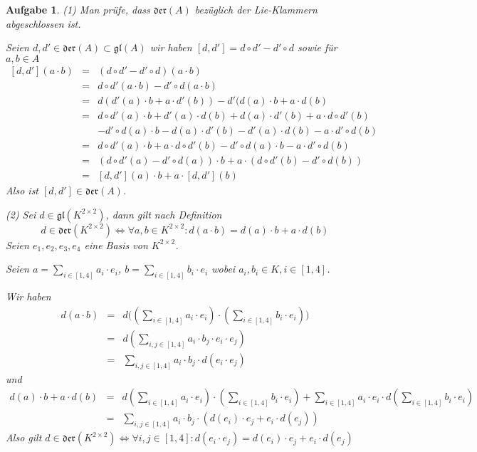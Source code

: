 \documentclass[12pt,leqno,twoside]{book}
\newcommand{\barcl}{\begin{array}{rcl}}
\newcommand{\ea}{\end{array}}
\newtheorem{AG}{Aufgabe}
\begin{document}
\begin{AG}
\rm
(1) Man pr\"ufe, dass $\mathfrak{der}(A)$ bez\"uglich der Lie-Klammern abgeschlossen ist.

Seien $d, d' \in\mathfrak{der}(A)\subset \mathfrak{gl}(A) $ wir haben $[d,d']= d\circ d' - d' \circ d$ sowie f\"ur $a, b \in A$
\[
\barcl
[d,d'](a\cdot b) & = & (d\circ d' - d' \circ d)(a\cdot b)\\
				 & = & d\circ d'(a\cdot b) - d'\circ d(a\cdot b)\\
				 & = & d(d'(a)\cdot b + a\cdot d'(b)) - d'(d(a)\cdot b + a\cdot d(b)\\
				 & = & d\circ d'(a)\cdot b + d'(a)\cdot d(b) + d(a)\cdot d'(b) + a\cdot d\circ d'(b)\\
				 &   & -d'\circ d(a)\cdot b - d(a)\cdot d'(b) - d'(a)\cdot d(b) -a\cdot d'\circ d(b)\\
				 & = & d\circ d'(a)\cdot b + a\cdot d\circ d'(b) - d'\circ d(a)\cdot b -a\cdot d'\circ d(b)\\
				 & = & (d\circ d'(a) - d'\circ d (a)) \cdot b + a \cdot( d\circ d'(b)-d'\circ d(b))\\
				 & = & [d,d'](a)\cdot b + a\cdot [d,d'](b)
\ea
\]
Also ist $[d,d']\in \mathfrak{der}(A)$.

(2) Sei $d\in \mathfrak{gl}(K^{2\times 2})$, dann gilt nach Definition
\[
d \in  \mathfrak{der}(K^{2\times 2}) \Leftrightarrow \forall a,b \in K^{2\times 2}: d(a\cdot b) = d(a)\cdot b + a \cdot d(b) 
\]
Seien $e_1,e_2,e_3,e_4$ eine Basis von $K^{2\times 2}$.

Seien $a = \sum\limits_{i\in [1,4] }a_i\cdot e_i$, $b = \sum\limits_{i\in [1,4] }b_i\cdot e_i$ wobei $a_i, b_i \in K , i\in[1,4]$.

Wir haben
\[
\barcl
d(a\cdot b) & = &d\big((\sum\limits_{i\in [1,4] }a_i\cdot e_i )\cdot (\sum\limits_{i\in [1,4] }b_i\cdot e_i)\big)\\
			& = & d(\sum\limits_{i,j\in[1,4]} a_i\cdot b_j \cdot e_i\cdot e_j)\\
			& = & \sum\limits_{i,j\in[1,4]}a_i\cdot b_j \cdot d(e_i\cdot e_j)
\ea
\]
und
\[
\barcl
d(a)\cdot b + a\cdot d(b) & = & d(\sum\limits_{i\in [1,4] }a_i\cdot e_i)\cdot (\sum\limits_{i\in [1,4] }b_i\cdot e_i) + \sum\limits_{i\in [1,4] }a_i\cdot e_i \cdot d(\sum\limits_{i\in [1,4] }b_i\cdot e_i)\\
						  & = & \sum\limits_{i,j\in [1,4]} a_i\cdot b_j \cdot (d(e_i)\cdot e_j +e_i\cdot d(e_j))
\ea
\]
Also gilt $d\in \mathfrak{der}(K^{2\times 2})  \Leftrightarrow \forall i,j \in[1,4] :d(e_i\cdot e_j) = d(e_i)\cdot e_j +e_i\cdot d(e_j)$


\end{AG}
\end{document}
